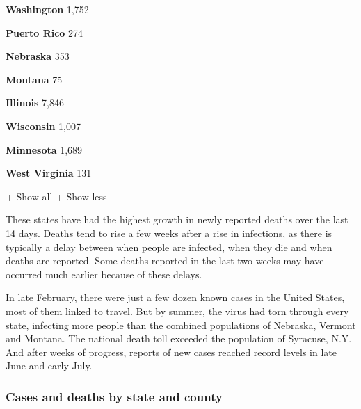 \href{https://www.nytimes.com/interactive/2020/us/washington-coronavirus-cases.html}{}

\textbf{Washington} 1,752

\href{https://www.nytimes.com/interactive/2020/us/puerto-rico-coronavirus-cases.html}{}

\textbf{Puerto Rico} 274

\href{https://www.nytimes.com/interactive/2020/us/nebraska-coronavirus-cases.html}{}

\textbf{Nebraska} 353

\href{https://www.nytimes.com/interactive/2020/us/montana-coronavirus-cases.html}{}

\textbf{Montana} 75

\href{https://www.nytimes.com/interactive/2020/us/illinois-coronavirus-cases.html}{}

\textbf{Illinois} 7,846

\href{https://www.nytimes.com/interactive/2020/us/wisconsin-coronavirus-cases.html}{}

\textbf{Wisconsin} 1,007

\href{https://www.nytimes.com/interactive/2020/us/minnesota-coronavirus-cases.html}{}

\textbf{Minnesota} 1,689

\href{https://www.nytimes.com/interactive/2020/us/west-virginia-coronavirus-cases.html}{}

\textbf{West Virginia} 131

+ Show all + Show less

These states have had the highest growth in newly reported deaths over
the last 14 days. Deaths tend to rise a few weeks after a rise in
infections, as there is typically a delay between when people are
infected, when they die and when deaths are reported. Some deaths
reported in the last two weeks may have occurred much earlier because of
these delays.

In late February, there were just a few dozen known cases in the United
States, most of them linked to travel. But by summer, the virus had torn
through every state, infecting more people than the combined populations
of Nebraska, Vermont and Montana. The national death toll exceeded the
population of Syracuse, N.Y. And after weeks of progress, reports of new
cases reached record levels in late June and early July.

\hypertarget{cases-and-deaths-by-state-and-county}{%
\subsubsection{Cases and deaths by state and
county}\label{cases-and-deaths-by-state-and-county}}

